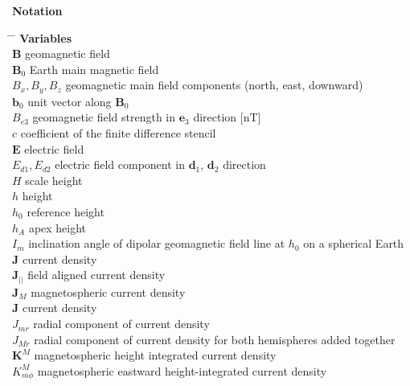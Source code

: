 %
\textbf{\Large{Notation}} 
%        						
\begin{tabbing}
\hspace{5mm} \= \hspace{23mm} \=  \kill
%
\textbf{\Large{Variables}}         						\\

\>$\mathbf{B} $         \>  geomagnetic field  \\
\>$\mathbf{B}_0 $       \>  Earth main magnetic field  \\
\>$B_x, B_y, B_z$       \>  geomagnetic main field components (north, east, downward)  \\
\>$\mathbf{b}_0 $       \>  unit vector along $\mathbf{B}_0 $  \\
\>$B_{e3}$        	\>  geomagnetic field strength in $\mathbf{e}_3$ direction [nT]   \\
\>$c$        		\>  coefficient of the finite difference stencil   \\
\>$\mathbf E$        	\>  electric field   \\
\>$E_{d1}, E_{d2}$      \>  electric field component in $\mathbf{d}_1$,
                            $\mathbf{d}_2$ direction  \\
\>$H$        		\>  scale height    \\
\>$h$        		\>  height   \\
\>$h_0$        		\>  reference height   \\
\>$h_A$        		\>  apex height   \\
\>$I_m$        		\>  inclination angle of dipolar geomagnetic field line at $h_0$ on a spherical Earth  \\
\>$\mathbf J$        	\>  current density   \\
\>$\mathbf J_{||}$      \>  field aligned current density   \\
\>$\mathbf J_{M}$       \>  magnetospheric current density   \\
\>$\mathbf J$        	\>  current density   \\
\>$J_{mr}$        	\>  radial component of current density   \\
\>$J_{Mr}$        	\>  radial component of current density for both hemispheres added together  \\
\>$\mathbf K^{M}$       \>  magnetospheric height integrated current density   \\
\>$K_{m\phi}^{M}$       \>  magnetospheric eastward height-integrated current density   \\

\end{tabbing}
